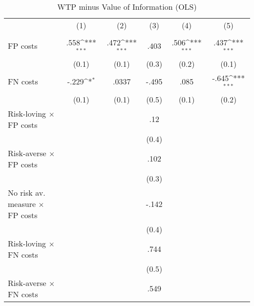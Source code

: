 \begin{table}[htbp]\centering
\def\sym#1{\ifmmode^{#1}\else\(^{#1}\)\fi}
\caption{WTP minus Value of Information (OLS)}
\begin{tabular}{l*{5}{c}}
\hline\hline
                &\multicolumn{1}{c}{(1)}&\multicolumn{1}{c}{(2)}&\multicolumn{1}{c}{(3)}&\multicolumn{1}{c}{(4)}&\multicolumn{1}{c}{(5)}\\
                &\multicolumn{1}{c}{}&\multicolumn{1}{c}{}&\multicolumn{1}{c}{}&\multicolumn{1}{c}{}&\multicolumn{1}{c}{}\\
\hline
FP costs        &     .558\sym{***}&     .472\sym{***}&     .403         &     .506\sym{***}&     .437\sym{***}\\
                &    (0.1)         &    (0.1)         &    (0.3)         &    (0.2)         &    (0.1)         \\
FN costs        &    -.229\sym{*}  &    .0337         &    -.495         &     .085         &    -.645\sym{***}\\
                &    (0.1)         &    (0.1)         &    (0.5)         &    (0.1)         &    (0.2)         \\
Risk-loving $\times$ FP costs&                  &                  &      .12         &                  &                  \\
                &                  &                  &    (0.4)         &                  &                  \\
Risk-averse $\times$ FP costs&                  &                  &     .102         &                  &                  \\
                &                  &                  &    (0.3)         &                  &                  \\
No risk av. measure $\times$ FP costs&                  &                  &    -.142         &                  &                  \\
                &                  &                  &    (0.4)         &                  &                  \\
Risk-loving $\times$ FN costs&                  &                  &     .744         &                  &                  \\
                &                  &                  &    (0.5)         &                  &                  \\
Risk-averse $\times$ FN costs&                  &                  &     .549         &                  &                  \\

\end{tabular}
\end{table}
